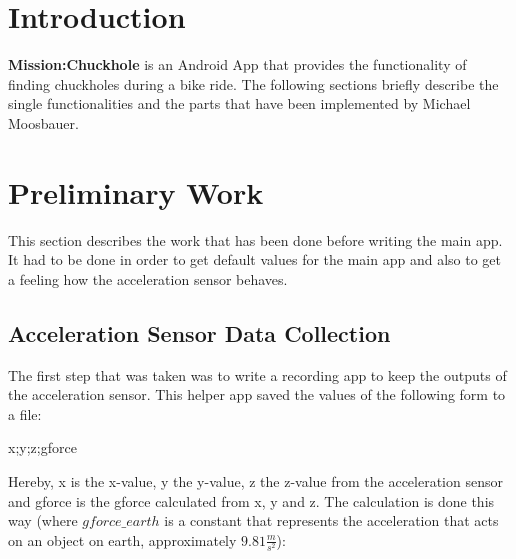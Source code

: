 \documentclass[10pt,a4paper]{article} %
\begin{document}
    \pagestyle{plain}
    \title{\rmfamily\normalfont{}}
    \author{}
    \date{} %
    
    \maketitle
    
       
    \tableofcontents


	

    
    \section{Introduction}
	\textbf{Mission:Chuckhole} is an Android App that provides the functionality of finding chuckholes during a bike ride. 
	The following sections briefly describe the single functionalities and the parts that have been implemented by Michael Moosbauer.


    \section{Preliminary Work}

	This section describes the work that has been done before writing the main app.
	It had to be done in order to get default values for the main app and also to get a feeling how the acceleration sensor behaves.
	
	\subsection{Acceleration Sensor Data Collection}\label{subsec:data_collection}
		
		The first step that was taken was to write a recording app to keep the outputs of the acceleration sensor.
		This helper app saved the values of the following form to a file:

		\begin{center}
			x;y;z;gforce
		\end{center}

		\noindent
		Hereby, x is the x-value, y the y-value, z the z-value from the acceleration sensor and gforce is the gforce calculated from x, y and z.
		The calculation is done this way (where $gforce\_earth$ is a constant that represents the acceleration that acts on an object on earth, approximately $9.81 \frac{m}{s^2}$):
\end{document}
